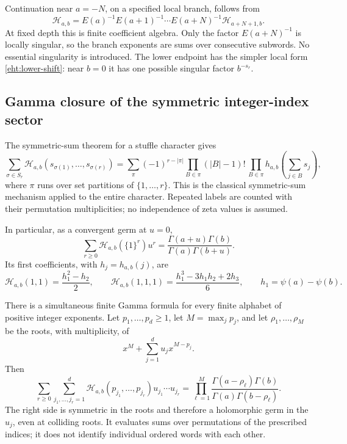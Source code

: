 \documentclass[11pt]{article}
\numberwithin{equation}{section}
\theoremstyle{plain}
\theoremstyle{definition}
\theoremstyle{remark}
\begin{document}
Continuation near $a=-N$, on a specified local branch, follows from
\[
 \mathcal H_{a,b}=E(a)^{-1}E(a+1)^{-1}\cdots E(a+N)^{-1}
                         \mathcal H_{a+N+1,b}.
\]
At fixed depth this is finite coefficient algebra.  Only the factor
$E(a+N)^{-1}$ is locally singular, so the branch exponents are sums over
consecutive subwords.  No essential singularity is introduced.  The
lower endpoint has the simpler local form \eqref{eht:lower-shift}: near
$b=0$ it has one possible singular factor $b^{-s_r}$.

\subsection{Gamma closure of the symmetric integer-index sector}

The symmetric-sum theorem for a stuffle character gives
\begin{equation}\label{eht:symmetric}
 \sum_{\sigma\in S_r}\mathcal H_{a,b}(s_{\sigma(1)},\ldots,s_{\sigma(r)})
 =\sum_{\pi}(-1)^{r-|\pi|}
       \prod_{B\in\pi}(|B|-1)!\,
       \prod_{B\in\pi}h_{a,b}\left(\sum_{j\in B}s_j\right),
\end{equation}
where $\pi$ runs over set partitions of $\{1,\ldots,r\}$.
This is the classical symmetric-sum mechanism applied to the entire
character.  Repeated labels are counted with their permutation
multiplicities; no independence of zeta values is assumed.

In particular, as a convergent germ at $u=0$,
\begin{equation}\label{eht:ones-Gamma}
 \boxed{\sum_{r\ge0}\mathcal H_{a,b}(\{1\}^r)u^r
       =\frac{\Gamma(a+u)\Gamma(b)}{\Gamma(a)\Gamma(b+u)}.}
\end{equation}
Its first coefficients, with $h_j=h_{a,b}(j)$, are
\[
 \mathcal H_{a,b}(1,1)=\frac{h_1^2-h_2}{2},\qquad
 \mathcal H_{a,b}(1,1,1)=\frac{h_1^3-3h_1h_2+2h_3}{6},
 \qquad h_1=\psi(a)-\psi(b).
\]

There is a simultaneous finite Gamma formula for every finite alphabet
of positive integer exponents.  Let $p_1,\ldots,p_d\ge1$, let
$M=\max_jp_j$, and let $\rho_1,\ldots,\rho_M$ be the roots, with
multiplicity, of
\[
 x^M+\sum_{j=1}^du_jx^{M-p_j}.
\]
Then
\begin{equation}\label{eht:alphabet-Gamma}
 \boxed{\sum_{r\ge0}\sum_{j_1,\ldots,j_r=1}^d
  \mathcal H_{a,b}(p_{j_1},\ldots,p_{j_r})u_{j_1}\cdots u_{j_r}
  =\prod_{\ell=1}^M
       \frac{\Gamma(a-\rho_\ell)\Gamma(b)}
            {\Gamma(a)\Gamma(b-\rho_\ell)}.}
\end{equation}
The right side is symmetric in the roots and therefore a holomorphic
germ in the $u_j$, even at colliding roots.  It evaluates sums over
permutations of the prescribed indices; it does not identify individual
ordered words with each other.
\end{document}
